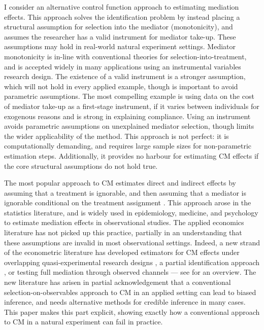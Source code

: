 I consider an alternative control function approach to estimating mediation effects.
This approach solves the identification problem by instead placing a structural assumption for selection into the mediator (monotonicity), and assumes the researcher has a valid instrument for mediator take-up.
These assumptions may hold in real-world natural experiment settings.
Mediator monotonicity is in-line with conventional theories for selection-into-treatment, and is accepted widely in many applications using an instrumental variables research design.
The existence of a valid instrument is a stronger assumption, which will not hold in every applied example, though is important to avoid parametric assumptions. %
The most compelling example is using data on the cost of mediator take-up as a first-stage instrument, if it varies between individuals for exogenous reasons and is strong in explaining compliance.
Using an instrument avoids parametric assumptions on unexplained mediator selection, though limits the wider applicability of the method.
This approach is not perfect: it is computationally demanding, and requires large sample sizes for non-parametric estimation steps.
Additionally, it provides no harbour for estimating CM effects if the core structural assumptions do not hold true.

The most popular approach to CM estimates direct and indirect effects by assuming that a treatment is ignorable, and then assuming that a mediator is ignorable conditional on the treatment assignment \citep{imai2010identification}.
This approach arose in the statistics literature, and is widely used in epidemiology, medicine, and psychology to estimate mediation effects in observational studies.
The applied economics literature has not picked up this practice, partially in an understanding that these assumptions are invalid in most observational settings.
Indeed, a new strand of the econometric literature has developed estimators for CM effects under overlapping quasi-experimental research designs \citep{deuchert2019direct,frolich2017direct}, a partial identification approach \citep{flores2009identification}, or testing full mediation through observed channels \citep{kwon2024testing} --- see \cite{huber2019review} for an overview.
The new literature has arisen in partial acknowledgement that a conventional selection-on-observables approach to CM in an applied setting can lead to biased inference, and needs alternative methods for credible inference in many cases.
This paper makes this part explicit, showing exactly how a conventional approach to CM in a natural experiment can fail in practice.

